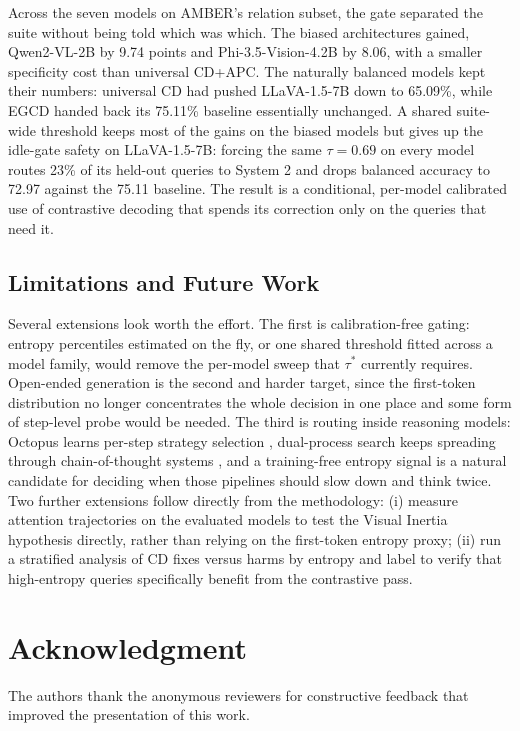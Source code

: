 \documentclass{ieeeaccess}
\begin{document}
Across the seven models on AMBER's relation subset, the gate separated the suite without being told which was which. The biased architectures gained, Qwen2-VL-2B by 9.74 points and Phi-3.5-Vision-4.2B by 8.06, with a smaller specificity cost than universal CD+APC. The naturally balanced models kept their numbers: universal CD had pushed LLaVA-1.5-7B down to 65.09\%, while EGCD handed back its 75.11\% baseline essentially unchanged. A shared suite-wide threshold keeps most of the gains on the biased models but gives up the idle-gate safety on LLaVA-1.5-7B: forcing the same $\tau = 0.69$ on every model routes 23\% of its held-out queries to System 2 and drops balanced accuracy to 72.97 against the 75.11 baseline. The result is a conditional, per-model calibrated use of contrastive decoding that spends its correction only on the queries that need it.

\subsection{Limitations and Future Work}\label{subsec:future}

Several extensions look worth the effort. The first is calibration-free gating: entropy percentiles estimated on the fly, or one shared threshold fitted across a model family, would remove the per-model sweep that $\tau^{*}$ currently requires. Open-ended generation is the second and harder target, since the first-token distribution no longer concentrates the whole decision in one place and some form of step-level probe would be needed. The third is routing inside reasoning models: Octopus learns per-step strategy selection \cite{suo2025octopus}, dual-process search keeps spreading through chain-of-thought systems \cite{cheng2025think,li2025system}, and a training-free entropy signal is a natural candidate for deciding when those pipelines should slow down and think twice. Two further extensions follow directly from the methodology: (i) measure attention trajectories on the evaluated models to test the Visual Inertia hypothesis directly, rather than relying on the first-token entropy proxy; (ii) run a stratified analysis of CD fixes versus harms by entropy and label to verify that high-entropy queries specifically benefit from the contrastive pass.

\section*{Acknowledgment}

The authors thank the anonymous reviewers for constructive feedback that improved the presentation of this work.
\end{document}
